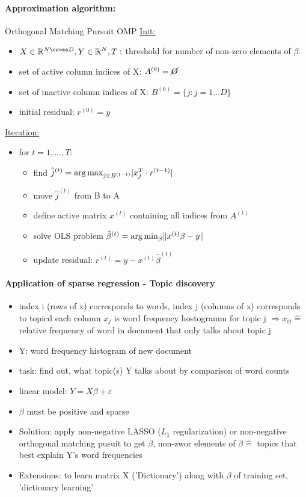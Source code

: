 \documentclass[11pt]{article}
\DeclareMathOperator*{\argmin}{arg\,min}
\DeclareMathOperator*{\argmax}{arg\,max}
\DeclarePairedDelimiter\abs{\lvert}{\rvert}
\DeclarePairedDelimiter\norm{\lVert}{\rVert}
\begin{document}
    \paragraph{Approximation algorithm:} Orthogonal Matching Pursuit OMP
    \underline{Init:}
    \begin{itemize}
      \item $X \in \mathbb{R}^{N\cross D}, Y \in \mathbb{R}^N, T:$ threshold for
      number of non-zero elements of $\beta$.
      \item set of active column indices of X: $A^{(0)} = \cancel{O}$
      \item set of inactive column indices of X: $B^{(0)} = \{ j:j=1...D \}$
      \item initial residual: $r^{(0)}=y$
    \end{itemize}
    \underline{Iteration:}
    \begin{itemize}
      \item for $t=1,...,T:$
      \begin{itemize}
        \item find $\hat{j}^{(t)}=\argmax_{j\in B^{(t-1)}} \abs{x_j^T \cdot r^{(t-1)}}$
        \item move $\hat{j}^{(t)}$ from B to A
        \item define active matrix $x^{(t)}$ containing all indices from $A^{(t)}$
        \item solve OLS problem $\hat{\beta}^{(t)}=\argmin_\beta \norm{x^{(t)}\beta-y}$
        \item update residual: $r^{(t)}=y-x^{(t)}\hat{\beta}^{(t)}$
      \end{itemize}
    \end{itemize}
    \paragraph{Application of sparse regression - Topic discovery}
    \begin{itemize}
      \item index i (rows of x) corresponds to words, index j (columns of x)
      corresponds to topicd
      \items each column $x_j$ is word frequency hostogramm for topic j
      $\Rightarrow x_{ij} \widehat{=}$ relative frequency of word in document
      that only talks about topic j
      \item Y: word frequency histogram of new document
      \item task: find out, what topic(s) Y talks about by comparison of word counts
      \item linear model: $Y=X\beta + \varepsilon$
      \item $\beta$ must be positive and sparse
      \item Solution: apply non-negative LASSO ($L_1$ regularization) or non-negative
      orthogonal matching pusuit to get $\beta$, non-zwor elements of $\beta
      \widehat{=}$ topics that best explain Y's word frequencies
      \item Extensions: to learn matrix X ('Dictionary') along with $\beta$ of
      training set, 'dictionary learning'
    \end{itemize}
\end{document}

